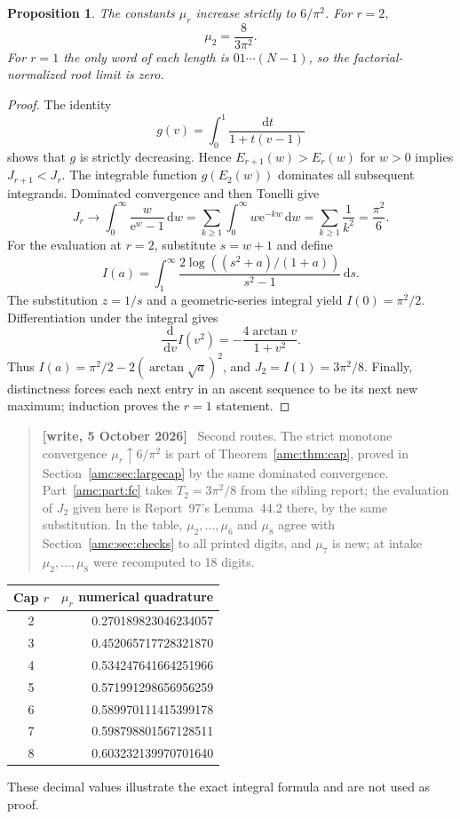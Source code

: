 \documentclass[11pt,letterpaper]{article}
\newtheorem{proposition}[theorem]{Proposition}
\theoremstyle{remark}\newtheorem{remark}[theorem]{Remark}
\newcommand{\ee}{\mathrm e}
\newcommand{\dd}{\,\mathrm d}
\newenvironment{writenotedated}[1]{\par\smallskip\begin{quote}\small\textbf{[write, #1]}\ }{\end{quote}\smallskip}
\begin{document}
\begin{proposition}\label{amc:bm:prop:capmonotone}
The constants $\mu_r$ increase strictly to $6/\pi^2$. For $r=2$,
\[
 \mu_2=\frac8{3\pi^2}.
\]
For $r=1$ the only word of each length is $01\cdots(N-1)$, so the factorial-normalized root limit is zero.
\end{proposition}
\begin{proof}
The identity
\begin{equation}\label{amc:bm:eq:gpositive}
 g(v)=\int_0^1\frac{\dd t}{1+t(v-1)}
\end{equation}
shows that $g$ is strictly decreasing. Hence $E_{r+1}(w)>E_r(w)$ for $w>0$ implies $J_{r+1}<J_r$. The integrable function $g(E_2(w))$ dominates all subsequent integrands. Dominated convergence and then Tonelli give
\[
 J_r\longrightarrow\int_0^\infty\frac{w}{\ee^w-1}\dd w
 =\sum_{k\ge1}\int_0^\infty w\ee^{-kw}\dd w
 =\sum_{k\ge1}\frac1{k^2}=\frac{\pi^2}{6}.
\]
For the evaluation at $r=2$, substitute $s=w+1$ and define
\[
 I(a)=\int_1^\infty\frac{2\log((s^2+a)/(1+a))}{s^2-1}\dd s.
\]
The substitution $z=1/s$ and a geometric-series integral yield $I(0)=\pi^2/2$. Differentiation under the integral gives
\[
 \frac{\dd}{\dd v}I(v^2)=-\frac{4\arctan v}{1+v^2}.
\]
Thus $I(a)=\pi^2/2-2(\arctan\sqrt a)^2$, and $J_2=I(1)=3\pi^2/8$. Finally, distinctness forces each next entry in an ascent sequence to be its next new maximum; induction proves the $r=1$ statement.
\end{proof}

\begin{writenotedated}{5 October 2026}
Second routes. The strict monotone convergence $\mu_r\uparrow6/\pi^2$ is part of Theorem~\ref{amc:thm:cap}, proved in Section~\ref{amc:sec:largecap} by the same dominated convergence. Part~\ref{amc:part:fc} takes $T_2=3\pi^2/8$ from the sibling report; the evaluation of $J_2$ given here is Report~97's Lemma~44.2 there, by the same substitution. In the table, $\mu_2,\ldots,\mu_6$ and $\mu_8$ agree with Section~\ref{amc:sec:checks} to all printed digits, and $\mu_7$ is new; at intake $\mu_2,\ldots,\mu_8$ were recomputed to 18 digits.
\end{writenotedated}

\begin{center}
\begin{tabular}{@{}cr@{}}
\toprule
Cap $r$ & $\mu_r$ \quad numerical quadrature\\
\midrule
2&0.270189823046234057\\
3&0.452065717728321870\\
4&0.534247641664251966\\
5&0.571991298656956259\\
6&0.589970111415399178\\
7&0.598798801567128511\\
8&0.603232139970701640\\
\bottomrule
\end{tabular}
\end{center}
These decimal values illustrate the exact integral formula and are not used as proof.
\end{document}
